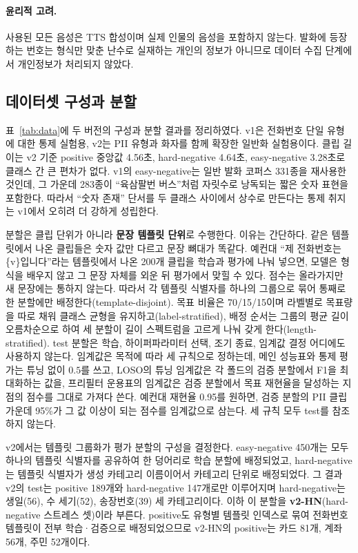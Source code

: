 \documentclass[10pt,twocolumn]{article}
\renewcommand{\emph}[1]{\textbf{#1}}
\begin{document}
\paragraph{윤리적 고려.}
사용된 모든 음성은 TTS 합성이며 실제 인물의 음성을 포함하지 않는다. 발화에 등장하는 번호는
형식만 맞춘 난수로 실재하는 개인의 정보가 아니므로 데이터 수집 단계에서 개인정보가 처리되지
않았다.

\subsection{데이터셋 구성과 분할}\label{sec:data:split}
표~\ref{tab:data}에 두 버전의 구성과 분할 결과를 정리하였다. v1은 전화번호 단일 유형에 대한
통제 실험용, v2는 PII 유형과 화자를 함께 확장한 일반화 실험용이다. 클립 길이는 v2 기준
positive 중앙값 4.56초, hard-negative 4.64초, easy-negative 3.28초로 클래스 간 큰 편차가 없다.
v1의 easy-negative는 일반 발화 코퍼스 331종을 재사용한 것인데, 그 가운데 283종이 ``육삼팔번
버스''처럼 자릿수로 낭독되는 짧은 숫자 표현을 포함한다. 따라서 ``숫자 존재'' 단서를 두 클래스
사이에서 상수로 만든다는 통제 취지는 v1에서 오히려 더 강하게 성립한다.

분할은 클립 단위가 아니라 \emph{문장 템플릿 단위}로 수행한다. 이유는 간단하다. 같은 템플릿에서
나온 클립들은 숫자 값만 다르고 문장 뼈대가 똑같다. 예컨대 ``제 전화번호는 \{v\}입니다''라는
템플릿에서 나온 200개 클립을 학습과 평가에 나눠 넣으면, 모델은 형식을 배우지 않고 그 문장
자체를 외운 뒤 평가에서 맞힐 수 있다. 점수는 올라가지만 새 문장에는 통하지 않는다. 따라서 각 템플릿 식별자를 하나의 그룹으로 묶어 통째로 한 분할에만
배정한다(template-disjoint). 목표 비율은 70/15/15이며 라벨별로 목표량을 따로 채워 클래스
균형을 유지하고(label-stratified), 배정 순서는 그룹의 평균 길이 오름차순으로 하여 세 분할이
길이 스펙트럼을 고르게 나눠 갖게 한다(length-stratified). test 분할은 학습, 하이퍼파라미터
선택, 조기 종료, 임계값 결정 어디에도 사용하지 않는다. 임계값은 목적에 따라 세 규칙으로
정하는데, 메인 성능표와 통제 평가는 튜닝 없이 $0.5$를 쓰고, LOSO의 튜닝 임계값은 각 폴드의
검증 분할에서 F1을 최대화하는 값을, 프리필터 운용표의 임계값은 검증 분할에서 목표
재현율을 달성하는 지점의 점수를 그대로 가져다 쓴다. 예컨대 재현율 0.95를 원하면, 검증 분할의
PII 클립 가운데 95\%가 그 값 이상이 되는 점수를 임계값으로 삼는다. 세 규칙 모두 test를 참조하지 않는다.

v2에서는 템플릿 그룹화가 평가 분할의 구성을 결정한다. easy-negative 450개는 모두 하나의 템플릿
식별자를 공유하여 한 덩어리로 학습 분할에 배정되었고, hard-negative는 템플릿 식별자가 생성
카테고리 이름이어서 카테고리 단위로 배정되었다. 그 결과 v2의 test는 positive 189개와
hard-negative 147개로만 이루어지며 hard-negative는 생일(56), 수 세기(52), 송장번호(39) 세
카테고리이다. 이하 이 분할을 \textbf{v2-HN}(hard-negative 스트레스 셋)이라 부른다. positive도
유형별 템플릿 인덱스로 묶여 전화번호 템플릿이 전부 학습·검증으로 배정되었으므로 v2-HN의
positive는 카드 81개, 계좌 56개, 주민 52개이다.
\end{document}
